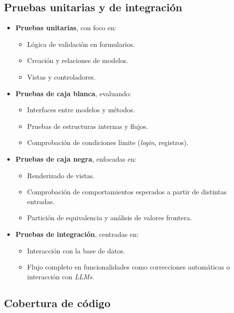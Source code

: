 \subsection*{Pruebas unitarias y de integración}
\begin{itemize}
  \item \textbf{Pruebas unitarias}, con foco en:
    \begin{itemize}
      \item Lógica de validación en formularios.
      \item Creación y relaciones de modelos.
      \item Vistas y controladores.
    \end{itemize}

  \item \textbf{Pruebas de caja blanca}, evaluando:
    \begin{itemize}
      \item Interfaces entre modelos y métodos.
      \item Pruebas de estructuras internas y flujos.
      \item Comprobación de condiciones límite (\textit{login}, registros).
    \end{itemize}

  \item \textbf{Pruebas de caja negra}, enfocadas en:
    \begin{itemize}
      \item Renderizado de vistas.
      \item Comprobación de comportamientos esperados a partir de distintas entradas.
      \item Partición de equivalencia y análisis de valores frontera.
    \end{itemize}

  \item \textbf{Pruebas de integración}, centradas en:
    \begin{itemize}
      \item Interacción con la base de datos.
      \item Flujo completo en funcionalidades como correcciones automáticas o interacción con \textit{LLMs}.
    \end{itemize}
\end{itemize}

\subsection*{Cobertura de código}

